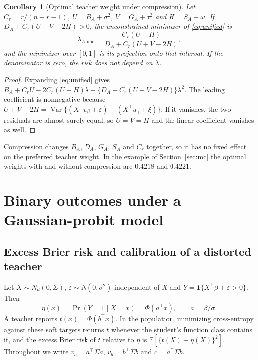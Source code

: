 \documentclass[11pt]{article}
\newtheorem{corollary}[theorem]{Corollary}
\theoremstyle{remark}
\newcommand{\E}{\mathbb E}
\newcommand{\Var}{\operatorname{Var}}
\newcommand{\1}{\mathbf 1}
\begin{document}
\begin{corollary}[Optimal teacher weight under compression]\label{cor:unifiedopt}
Let $C_r=r/(n-r-1)$, $U=B_A+\sigma^2$, $V=G_A+\tau^2$ and $H=S_A+\omega$. If $D_A+C_r(U+V-2H)>0$, the unconstrained minimizer of \eqref{eq:unified} is
\begin{equation}\label{eq:lambdaunified}
 \lambda_{A,\mathrm{unc}}=\frac{C_r(U-H)}{D_A+C_r(U+V-2H)},
\end{equation}
and the minimizer over $[0,1]$ is its projection onto that interval. If the denominator is zero, the risk does not depend on $\lambda$.
\end{corollary}
\begin{proof}
Expanding \eqref{eq:unified} gives $B_A+C_rU-2C_r(U-H)\lambda+\{D_A+C_r(U+V-2H)\}\lambda^2$. The leading coefficient is nonnegative because $U+V-2H=\Var\{(X^\top u_\beta+\varepsilon)-(X^\top u_\gamma+\xi)\}$. If it vanishes, the two residuals are almost surely equal, so $U=V=H$ and the linear coefficient vanishes as well.
\end{proof}

Compression changes $B_A$, $D_A$, $G_A$, $S_A$ and $C_r$ together, so it has no fixed effect on the preferred teacher weight. In the example of Section~\ref{sec:mc} the optimal weights with and without compression are $0.4218$ and $0.4221$.

\section{Binary outcomes under a Gaussian-probit model}\label{sec:probit}
\subsection{Excess Brier risk and calibration of a distorted teacher}
Let $X\sim N_d(0,\Sigma)$, $\varepsilon\sim N(0,\sigma^2)$ independent of $X$ and $Y=\1\{X^\top\beta+\varepsilon>0\}$. Then
\begin{equation}\label{eq:probit}
\eta(x)=\Pr(Y=1\mid X=x)=\Phi(a^\top x),\qquad a=\beta/\sigma .
\end{equation}
A teacher reports $t(x)=\Phi(b^\top x)$. In the population, minimizing cross-entropy against these soft targets returns $t$ whenever the student's function class contains it, and the excess Brier risk of $t$ relative to $\eta$ is $\E[\{t(X)-\eta(X)\}^2]$. Throughout we write $v_a=a^\top\Sigma a$, $v_b=b^\top\Sigma b$ and $c=a^\top\Sigma b$.
\end{document}
